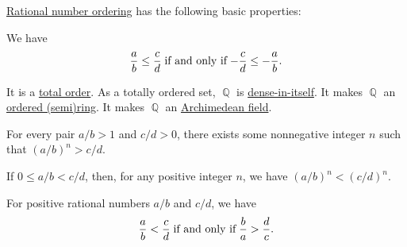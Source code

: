 \begin{proposition}\label{thm:def:rational_numbers_ordering}
  \hyperref[def:rational_numbers_ordering]{Rational number ordering} has the following basic properties:
  \begin{thmenum}
     We have
    \begin{equation*}
      \frac a b \leq \frac c d \T{if and only if} -\frac c d \leq -\frac a b.
    \end{equation*}

     It is a \hyperref[def:totally_ordered_set]{total order}.
     As a totally ordered set, \( \BbbQ \) is \hyperref[def:dense_total_order]{dense-in-itself}.
     It makes \( \BbbQ \) an \hyperref[def:ordered_semiring]{ordered (semi)ring}.
     It makes \( \BbbQ \) an \hyperref[def:archimedean_semiring]{Archimedean field}.

     For every pair \( a / b > 1 \) and \( c / d > 0 \), there exists some nonnegative integer \( n \) such that \( (a / b)^n > c / d \).

     If \( 0 \leq a / b < c / d \), then, for any positive integer \( n \), we have \( (a / b)^n < (c / d)^n \).

     For positive rational numbers \( a / b \) and \( c / d \), we have
    \begin{equation}\label{eq:thm:def:rational_numbers_ordering/reciprocal}
      \frac a b < \frac c d \T{if and only if} \frac b a > \frac d c.
    \end{equation}
  \end{thmenum}
\end{proposition}
